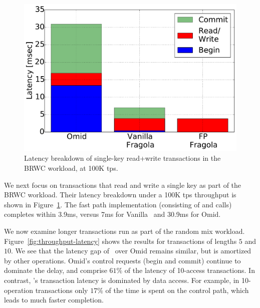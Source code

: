 \begin{figure}[htb]
\centering
\includegraphics[width=.48\textwidth]{figs/latency_rwm.pdf}
\caption{Latency breakdown of single-key read+write transactions in the BRWC workload,
at 100K tps.}
\label{fig:rmw}
\end{figure}

We next focus on transactions that read and write a single key as part of the BRWC workload. 
Their latency breakdown under a 100K tps throughput is shown in Figure~\ref{fig:rmw}.
The fast path implementation (consisting of  and  calls) completes within 3.9ms,
versus 7ms for Vanilla \sys\ and 30.9ms for Omid. 

We now examine longer transactions run as part of the random mix workload.
Figure~\ref{fig:throughput-latency} shows the results for transactions of lengths $5$ and $10$.
We see that the latency gap of \sys\ over Omid remains similar, but is amortized 
by other operations. Omid's control requests (begin and commit) continue to 
dominate the delay, and comprise $61\%$ of the latency of 10-access transactions.
In contrast, \sys's transaction latency is dominated by data access. For example, in 10-operation transactions only 
$17\%$ of the time is spent on the control path, which leads to much faster completion. 

